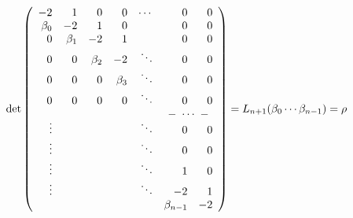 \[
\det\left(\begin{array}{rrrrrrr}
-2&1&0&0&\cdots&0&0\\
\beta_0&-2&1&0&&0&0\\
0&\beta_1&-2&1&&0&0\\
0&0&\beta_2&-2&\ddots&0&0\\
0&0&0&\beta_3&\ddots&0&0\\
0&0&0&0&\ddots&0&0\\
&&&&&\multicolumn{2}{c}{-\ \cdots\ -}\\[-4pt]
\vdots&&&&\ddots&0&0\\
\vdots&&&&\ddots&0&0\\
\vdots&&&&\ddots&1&0\\
\vdots&&&&\ddots&-2&1\\
&&&&&\beta_{n-1}&-2
\end{array}\right)=L_{n+1}(\beta_0\cdots\beta_{n-1})=\rho
\]



